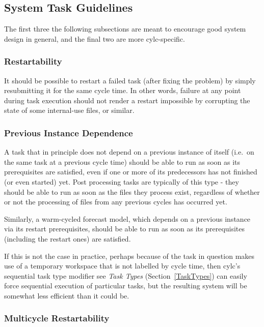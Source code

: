 \documentclass[11pt,a4paper]{article}
\begin{document}
\subsection{System Task Guidelines} 
\label{SystemTaskGuidelines}

The first three the following subsections are meant to encourage good
system design in general, and the final two are more cylc-specific.

\subsubsection{Restartability}

It should be possible to restart a failed task (after fixing the
problem) by simply resubmitting it for the same cycle time. In other
words, failure at any point during task execution should not render a
restart impossible by corrupting the state of some internal-use files,
or similar. 

\subsubsection{Previous Instance Dependence} 

A task that in principle does not depend on a previous instance of
itself (i.e.\ on the same task at a previous cycle time) should be able
to run as soon as its prerequisites are satisfied, even if one or more
of its predecessors has not finished (or even started) yet.  Post
processing tasks are typically of this type - they should be able to run
as soon as the files they process exist, regardless of whether or not
the processing of files from any previous cycles has occurred yet.

Similarly, a warm-cycled forecast model, which depends on a previous
instance via its restart prerequisites, should be able to run as soon as
its prerequisites (including the restart ones) are satisfied.

If this is not the case in practice, perhaps because of the task in
question makes use of a temporary workspace that is not labelled by
cycle time, then cylc's sequential task type modifier see {\em Task
Types} (Section~\ref{TaskTypes}) can easily force sequential execution
of particular tasks, but the resulting system will be somewhat less
efficient than it could be.

\subsubsection{Multicycle Restartability} 
\end{document}
